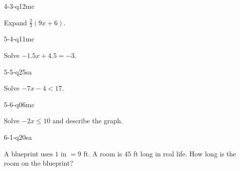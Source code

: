\begin{practiceQuestion}{4-3-q12}{mc}
\begin{questionText}
Expand $\frac{2}{3}(9x + 6)$.


\end{questionText}
\end{practiceQuestion}

\begin{practiceQuestion}{5-4-q11}{mc}
\begin{questionText}
Solve $-1.5x + 4.5 = -3$.
\end{questionText}
\end{practiceQuestion}

\begin{practiceQuestion}{5-5-q25}{sa}
\begin{questionText}
Solve $-7x - 4 < 17$.
\end{questionText}
\end{practiceQuestion}

\begin{practiceQuestion}{5-6-q06}{mc}
\begin{questionText}
Solve $-2x \leq 10$ and describe the graph.
\end{questionText}
\end{practiceQuestion}

\begin{practiceQuestion}{6-1-q20}{sa}
\begin{questionText}
A blueprint uses $1$ in $= 9$ ft. A room is $45$ ft long in real life. How long is the room on the blueprint?
\end{questionText}
\end{practiceQuestion}

